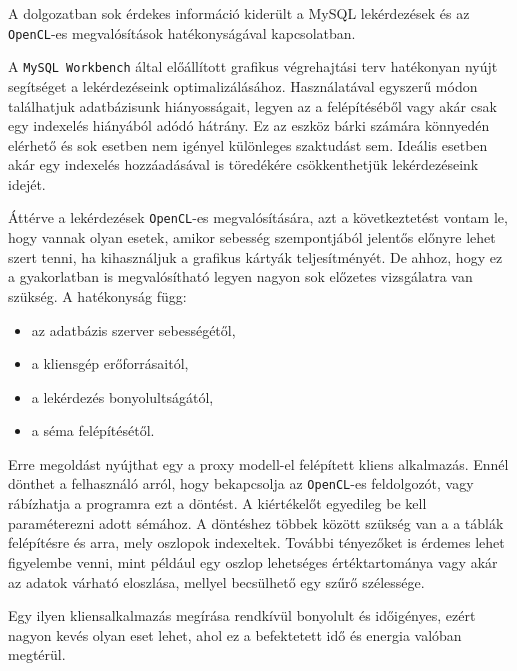
A dolgozatban sok érdekes információ kiderült a MySQL lekérdezések és az \texttt{OpenCL}-es megvalósítások hatékonyságával kapcsolatban.

A \texttt{MySQL Workbench} által előállított grafikus végrehajtási terv hatékonyan nyújt segítséget a lekérdezéseink optimalizálásához. Használatával egyszerű módon találhatjuk adatbázisunk hiányosságait, legyen az a felépítéséből vagy akár csak egy indexelés hiányából adódó hátrány. Ez az eszköz bárki számára könnyedén elérhető és sok esetben nem igényel különleges szaktudást sem. Ideális esetben akár egy indexelés hozzáadásával is töredékére csökkenthetjük lekérdezéseink idejét.

Áttérve a lekérdezések \texttt{OpenCL}-es megvalósítására, azt a következtetést vontam le, hogy vannak olyan esetek, amikor sebesség szempontjából jelentős előnyre lehet szert tenni, ha kihasználjuk a grafikus kártyák teljesítményét. De ahhoz, hogy ez a gyakorlatban is megvalósítható legyen nagyon sok előzetes vizsgálatra van szükség. A hatékonyság függ:
\begin{itemize}
\item az adatbázis szerver sebességétől,
\item a kliensgép erőforrásaitól,
\item a lekérdezés bonyolultságától,
\item a séma felépítésétől.
\end{itemize}

Erre megoldást nyújthat egy a proxy modell-el felépített kliens alkalmazás. Ennél dönthet a felhasználó arról, hogy bekapcsolja az \texttt{OpenCL}-es feldolgozót, vagy rábízhatja a programra ezt a döntést. A kiértékelőt egyedileg be kell paraméterezni adott sémához. A döntéshez többek között szükség van a a táblák felépítésre és arra, mely oszlopok indexeltek. További tényezőket is érdemes lehet figyelembe venni, mint például egy oszlop lehetséges értéktartománya vagy akár az adatok várható eloszlása, mellyel becsülhető egy szűrő szélessége. 

Egy ilyen kliensalkalmazás megírása rendkívül bonyolult és időigényes, ezért nagyon kevés olyan eset lehet, ahol ez a befektetett idő és energia valóban megtérül. 
